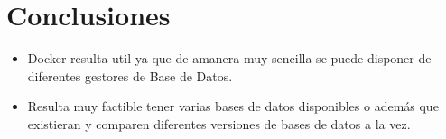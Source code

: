 \section{Conclusiones}
\begin{itemize}
	\item Docker resulta util ya que de amanera muy sencilla se puede disponer de diferentes gestores de Base de Datos.
	
	\item Resulta muy  factible tener varias bases de datos disponibles o además que existieran y comparen diferentes versiones de bases de datos a la vez.
\end{itemize}

\newpage
